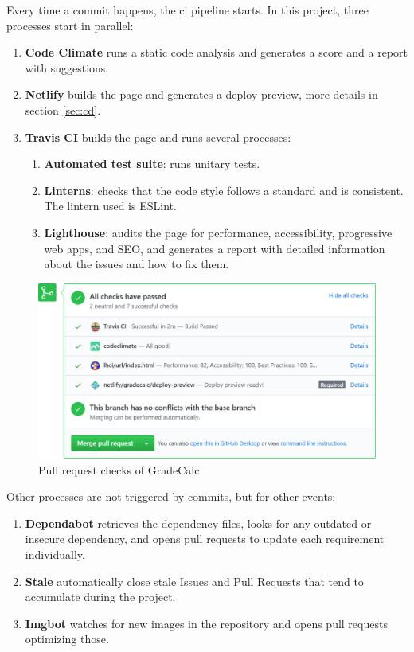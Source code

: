 Every time a commit happens, the ci pipeline starts. In this project, three processes start in parallel:
\begin{enumerate}[itemsep=0mm]
    \item \textbf{Code Climate} runs a static code analysis and generates a score and a report with suggestions.
    \item \textbf{Netlify} builds the page and generates a deploy preview, more details in section \ref{sec:cd}.
    \item \textbf{Travis CI} builds the page and runs several processes:
    \begin{enumerate}[itemsep=0mm]
        \item \textbf{Automated test suite}: runs unitary tests.
        \item \textbf{Linterns}: checks that the code style follows a standard and is consistent. The lintern used is ESLint.
        \item \textbf{Lighthouse}: audits the page for performance, accessibility, progressive web apps, and SEO, and generates a report with detailed information about the issues and how to fix them.
    \end{enumerate}
\end{enumerate}

\vfill
\begin{figure}[ht!]
    \center
    \includegraphics[width=\textwidth]{media/screenshot-pr.png}
    \caption{Pull request checks of GradeCalc}
    \label{pr}
\end{figure}
\vfill

\clearpage\newpage\noindent
Other processes are not triggered by commits, but for other events:
\begin{enumerate}[itemsep=0mm]
    \item \textbf{Dependabot} retrieves the dependency files, looks for any outdated or insecure dependency, and opens pull requests to update each requirement individually.
    \item \textbf{Stale} automatically close stale Issues and Pull Requests that tend to accumulate during the project.
    \item \textbf{Imgbot} watches for new images in the repository and opens pull requests optimizing those.
\end{enumerate}


